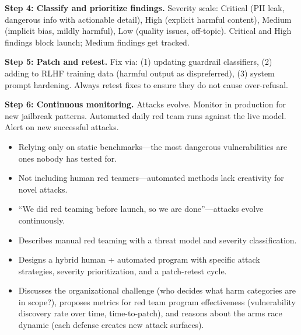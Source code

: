 \begin{interviewq}
\textbf{Step 4: Classify and prioritize findings.} Severity scale: Critical (PII leak, dangerous info with actionable detail), High (explicit harmful content), Medium (implicit bias, mildly harmful), Low (quality issues, off-topic). Critical and High findings block launch; Medium findings get tracked.

\textbf{Step 5: Patch and retest.} Fix via: (1) updating guardrail classifiers, (2) adding to RLHF training data (harmful output as dispreferred), (3) system prompt hardening. Always retest fixes to ensure they do not cause over-refusal.

\textbf{Step 6: Continuous monitoring.} Attacks evolve. Monitor in production for new jailbreak patterns. Automated daily red team runs against the live model. Alert on new successful attacks.

\redflags
\begin{itemize}
    \item Relying only on static benchmarks---the most dangerous vulnerabilities are ones nobody has tested for.
    \item Not including human red teamers---automated methods lack creativity for novel attacks.
    \item ``We did red teaming before launch, so we are done''---attacks evolve continuously.
\end{itemize}


\goodgreat
\begin{itemize}
    \item {} Describes manual red teaming with a threat model and severity classification.
    \item {} Designs a hybrid human + automated program with specific attack strategies, severity prioritization, and a patch-retest cycle.
    \item {} Discusses the organizational challenge (who decides what harm categories are in scope?), proposes metrics for red team program effectiveness (vulnerability discovery rate over time, time-to-patch), and reasons about the arms race dynamic (each defense creates new attack surfaces).
\end{itemize}

\end{interviewq}

